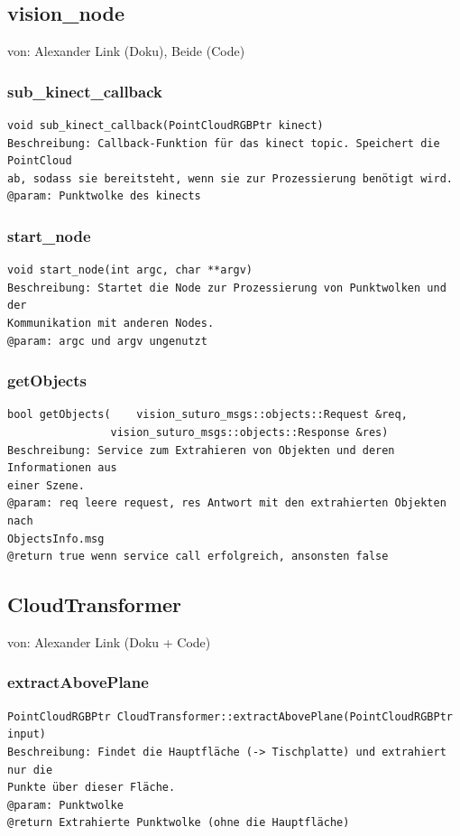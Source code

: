\documentclass{suturo}
\makeatletter
\newcommand{\chapterauthor}[1]{%
  {\parindent0pt\vspace*{-27pt}%
  \linespread{0}\small\begin{flushright}von: #1\end{flushright}%
  \par\nobreak\vspace*{0pt}}
  \@afterheading%
}
\makeatother
\begin{document}
\subsection*{vision\_node}
\chapterauthor{Alexander Link (Doku), Beide (Code)}
\subsubsection{sub\_kinect\_callback}
\begin{verbatim}
void sub_kinect_callback(PointCloudRGBPtr kinect)
Beschreibung: Callback-Funktion für das kinect topic. Speichert die PointCloud
ab, sodass sie bereitsteht, wenn sie zur Prozessierung benötigt wird.
@param: Punktwolke des kinects
\end{verbatim}\label{func:subkinectcallback}
\subsubsection{start\_node}
\begin{verbatim}
void start_node(int argc, char **argv)
Beschreibung: Startet die Node zur Prozessierung von Punktwolken und der
Kommunikation mit anderen Nodes.
@param: argc und argv ungenutzt
\end{verbatim}\label{func:startnode}
\subsubsection{getObjects}
\begin{verbatim}
bool getObjects(	vision_suturo_msgs::objects::Request &req, 
			    vision_suturo_msgs::objects::Response &res)
Beschreibung: Service zum Extrahieren von Objekten und deren Informationen aus
einer Szene.
@param: req leere request, res Antwort mit den extrahierten Objekten nach
ObjectsInfo.msg
@return true wenn service call erfolgreich, ansonsten false
\end{verbatim}\label{func:getobjects}


\subsection*{CloudTransformer}
\chapterauthor{Alexander Link (Doku + Code)}

\subsubsection{extractAbovePlane}
\begin{verbatim}
PointCloudRGBPtr CloudTransformer::extractAbovePlane(PointCloudRGBPtr input)
Beschreibung: Findet die Hauptfläche (-> Tischplatte) und extrahiert nur die
Punkte über dieser Fläche.
@param: Punktwolke
@return Extrahierte Punktwolke (ohne die Hauptfläche)
\end{verbatim}\label{func:extractaboveplane}
\end{document}

